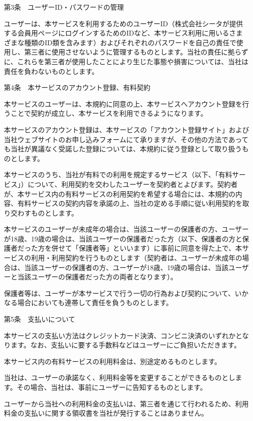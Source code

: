 第3条　ユーザーID・パスワードの管理

    ユーザーは、本サービスを利用するためのユーザーID（株式会社シータが提供する会員用ページにログインするためのIDなど、本サービス利用に用いるさまざまな種類のID類を含みます）およびそれぞれのパスワードを自己の責任で使用し、第三者に使用させないように管理するものとします。当社の責任に拠らずに、これらを第三者が使用したことにより生じた事態や損害については、当社は責任を負わないものとします。

第4条　本サービスのアカウント登録、有料契約

    本サービスのユーザーは、本規約に同意の上、本サービスへアカウント登録を行うことで契約が成立し、本サービスを利用できるようになります。

    本サービスのアカウント登録は、本サービスの「アカウント登録サイト」および当社ウェブサイトのお申し込みフォームにて承りますが、その他の方法であっても当社が異議なく受諾した登録については、本規約に従う登録として取り扱うものとします。

    本サービスのうち、当社が有料での利用を規定するサービス（以下、「有料サービス」）について、利用契約を交わしたユーザーを契約者とよびます。契約者が、本サービス内の有料サービスの利用契約を希望する場合には、本規約の内容、有料サービスの契約内容を承諾の上、当社の定める手順に従い利用契約を取り交わすものとします。

    本サービスのユーザーが未成年の場合は、当該ユーザーの保護者の方、ユーザーが18歳、19歳の場合は、当該ユーザーの保護者だった方（以下、保護者の方と保護者だった方を併せて「保護者等」といいます）に事前に同意を得た上で、本サービスの利用・利用契約を行うものとします（契約者は、ユーザーが未成年の場合は、当該ユーザーの保護者の方、ユーザーが18歳、19歳の場合は、当該ユーザーと当該ユーザーの保護者だった方の両者となります）。

    保護者等は、ユーザーが本サービスで行う一切の行為および契約について、いかなる場合においても連帯して責任を負うものとします。

第5条　支払いについて

    本サービスの支払い方法はクレジットカード決済、コンビニ決済のいずれかとなります。なお、支払いに要する手数料などはユーザーにご負担いただきます。

    本サービス内の有料サービスの利用料金は、別途定めるものとします。

    当社は、ユーザーの承諾なく、利用料金等を変更することができるものとします。その場合、当社は、事前にユーザーに告知するものとします。

    ユーザーから当社への利用料金の支払いは、第三者を通じて行われるため、利用料金の支払いに関する領収書を当社が発行することはありません。

